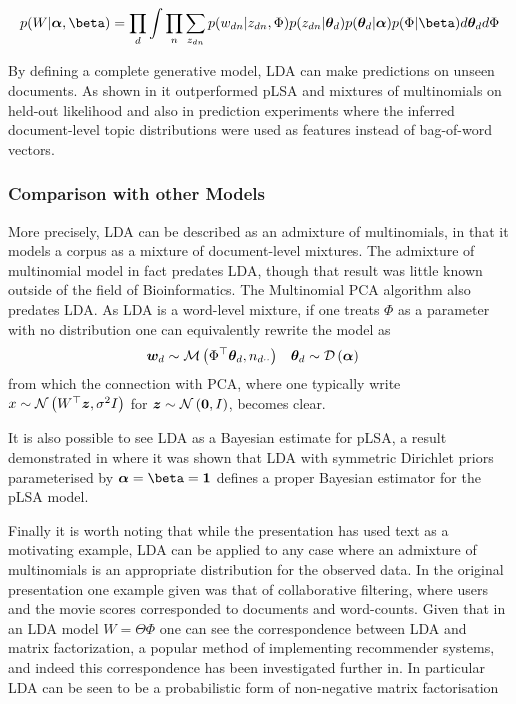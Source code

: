 \begin{align}
p(W | \vv{\alpha}, \vv{\beta}) = \prod_d \int \prod_n \sum_{z_{dn}} p(w_{dn}|z_{dn}, \Phi)p(z_{dn}|\thd)p(\thd|\vv{\alpha})p(\Phi|\vv{\beta}) d\thd d\Phi
\end{align}



By defining a complete generative model, LDA can make predictions on unseen documents. As shown in \cite{BleiNgJordan2003} it outperformed pLSA and mixtures of multinomials on held-out likelihood and also in prediction experiments where the inferred document-level topic distributions were used as features instead of bag-of-word vectors.

\subsubsection{Comparison with other Models}
More precisely, LDA can be described as an admixture of multinomials, in that it models a corpus as a mixture of document-level mixtures. The admixture of multinomial model\cite{Pritchard2000} in fact predates LDA, though that result was little known outside of the field of Bioinformatics. The Multinomial PCA algorithm\cite{Buntine2002} also predates LDA. As LDA is a word-level mixture, if one treats $\Phi$ as a parameter with no distribution one can equivalently rewrite the model as
\begin{align}
{  \bm w _d } & \sim \mathcal{M} \left( {\Phi^\top{  \bm \theta _d }},{n_{d\cdot\cdot}} \right) & { \bm \theta_d } & \sim \mathcal{D} \left( {\bm \alpha} \right)
\end{align}
from which the connection with PCA, where one typically write $x \sim \mathcal{N} \left( {W^\top\bm z}, {\sigma^2 I} \right)$ for $\bm z \sim \mathcal{N} \left( {\bm 0}, {I} \right)$, becomes clear.

It is also possible to see LDA as a Bayesian estimate for pLSA, a result demonstrated in \cite{GiKa2003} where it was shown that LDA with symmetric Dirichlet priors parameterised by $\vv{\alpha} = \vv{\beta} = \vv{1}$ defines a proper Bayesian estimator for the pLSA model. 

Finally it is worth noting that while the presentation has used text as a motivating example, LDA can be applied to any case where an admixture of multinomials is an appropriate distribution for the observed data. In the original presentation\cite{BleiNgJordan2003} one example given was that of collaborative filtering, where users and the movie scores corresponded to documents and word-counts. Given that in an LDA model $W = \Theta \Phi$ one can see the correspondence between LDA and matrix factorization, a popular method of implementing recommender systems\cite{Salakhutdinov2007}, and indeed this correspondence has been investigated further in\cite{Agarwal2010}. In particular LDA can be seen to be a probabilistic form of non-negative matrix factorisation\cite{Lin2007}

